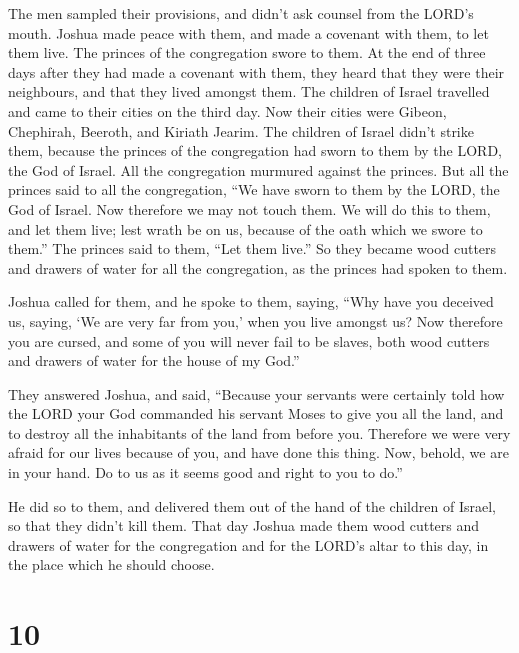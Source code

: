  The men sampled their provisions, and didn't ask counsel
from the LORD's mouth.  Joshua made peace with them, and
made a covenant with them, to let them live. The princes of the
congregation swore to them.  At the end of three days
after they had made a covenant with them, they heard that they were
their neighbours, and that they lived amongst them.  The
children of Israel travelled and came to their cities on the third day.
Now their cities were Gibeon, Chephirah, Beeroth, and Kiriath Jearim.
 The children of Israel didn't strike them, because the
princes of the congregation had sworn to them by the LORD, the God of
Israel. All the congregation murmured against the princes.
 But all the princes said to all the congregation, ``We
have sworn to them by the LORD, the God of Israel. Now therefore we may
not touch them.  We will do this to them, and let them
live; lest wrath be on us, because of the oath which we swore to them.''
 The princes said to them, ``Let them live.'' So they
became wood cutters and drawers of water for all the congregation, as
the princes had spoken to them.

 Joshua called for them, and he spoke to them, saying,
``Why have you deceived us, saying, `We are very far from you,' when you
live amongst us?  Now therefore you are cursed, and some
of you will never fail to be slaves, both wood cutters and drawers of
water for the house of my God.''

 They answered Joshua, and said, ``Because your servants
were certainly told how the LORD your God commanded his servant Moses to
give you all the land, and to destroy all the inhabitants of the land
from before you. Therefore we were very afraid for our lives because of
you, and have done this thing.  Now, behold, we are in
your hand. Do to us as it seems good and right to you to do.''

 He did so to them, and delivered them out of the hand of
the children of Israel, so that they didn't kill them. 
That day Joshua made them wood cutters and drawers of water for the
congregation and for the LORD's altar to this day, in the place which he
should choose.

\hypertarget{section-9}{%
\section{10}\label{section-9}}

